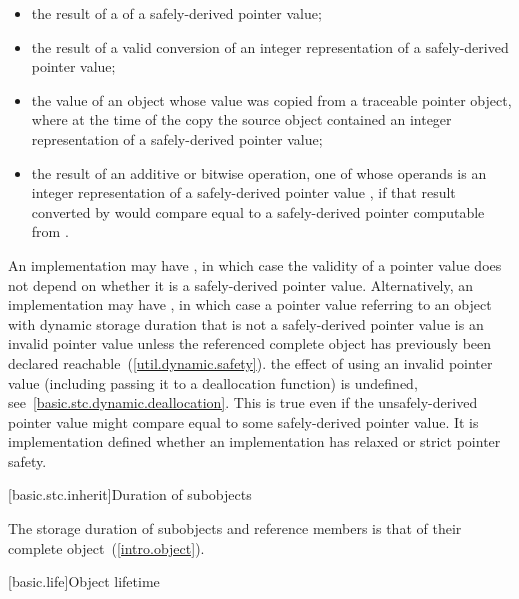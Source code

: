 \begin{itemize}
\item the result of a  of a safely-derived pointer value;

\item the result of a valid conversion of an integer representation of a safely-derived
pointer value;

\item the value of an object whose value was copied from a traceable pointer object,
where at the time of the copy the source object contained an integer representation of a
safely-derived pointer value;

\item the result of an additive or bitwise operation, one of whose operands is an
integer representation of a safely-derived pointer value , if that result
converted by  would compare equal to a safely-derived
pointer computable from .
\end{itemize}

\pnum
An implementation may have , in which case the
validity of a pointer value does not depend on whether it is a safely-derived
pointer value. Alternatively, an implementation may have , in which case a pointer value referring to an object with dynamic
storage duration that is not a safely-derived pointer
value is an invalid pointer value unless
the referenced complete object has previously been declared
reachable~(\ref{util.dynamic.safety}). \enternote
the effect of using an invalid pointer value (including passing it to a
deallocation function) is undefined, see~\ref{basic.stc.dynamic.deallocation}.
This is true even if the unsafely-derived pointer value might compare equal to
some safely-derived pointer value. \exitnote It is implementation
defined whether an implementation has relaxed or strict pointer safety.%
%

[basic.stc.inherit]{Duration of subobjects}

\pnum
{}%
The storage duration of subobjects and reference members
is that of their complete object~(\ref{intro.object}).
%

[basic.life]{Object lifetime}

